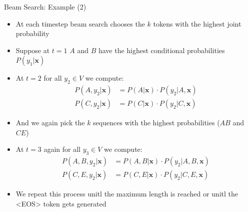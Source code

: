 \begin{vbframe}{Beam Search: Example (2)}

\vfill

\begin{itemize}
    \item At each timestep beam search chooses the $k$ tokens with the highest joint probability
    \item Suppose at $t=1$ $A$ and $B$ have the highest conditional probabilities $P(y_1|\mathbf{x})$
    \item At $t=2$ for all $y_2\in V$ we compute:
    $$
    \begin{aligned}
    P(A,y_2|\mathbf{x}) &= P(A|\mathbf{x})\cdot P(y_2|A,\mathbf{x}) \\
    P(C,y_2|\mathbf{x}) &= P(C|\mathbf{x})\cdot P(y_2|C,\mathbf{x})
    \end{aligned}
    $$
    \item And we again pick the $k$ sequences with the highest probabilities ($AB$ and $CE$)
    \item At $t=3$ again for all $y_3\in V$ we compute:
    $$
    \begin{aligned}
    P(A,B,y_2|\mathbf{x}) &= P(A,B|\mathbf{x})\cdot P(y_2|A,B,\mathbf{x}) \\
    P(C,E,y_2|\mathbf{x}) &= P(C,E|\mathbf{x})\cdot P(y_2|C,E,\mathbf{x})
    \end{aligned}
    $$
    \item We repeat this process unitl the maximum length is reached or unitl the <EOS> token gets generated
\end{itemize}

\vfill
    
\end{vbframe}


